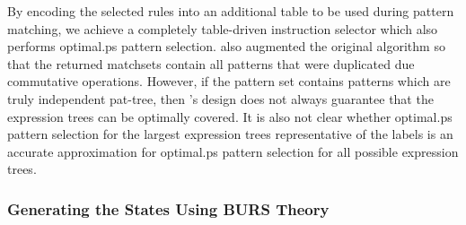 {By encoding the selected \glspl{rule} into an additional table to be used during
\gls{pattern matching}, we achieve a completely table-driven \gls{instruction
  selector} which also performs \gls{optimal.ps} \gls{pattern
  selection}.
%
\citeauthor{Hatcher1986} also augmented the original algorithm so
that the returned \glspl{matchset} contain all \glspl{pattern} that were
duplicated due commutative operations.
%
However, if the \gls{pattern set}
contains \glspl{pattern} which are truly \gls{independent pat-tree}, then
\citeauthor{Hatcher1986}'s design does not always guarantee that the
\glspl{expression tree} can be optimally covered.
%
It is also not clear whether
\gls{optimal.ps} \gls{pattern selection} for the largest \glspl{expression tree} representative of the labels is an accurate approximation for
\gls{optimal.ps} \gls{pattern selection} for all possible \glspl{expression tree}.


\subsubsection{Generating the States Using BURS Theory}

}
